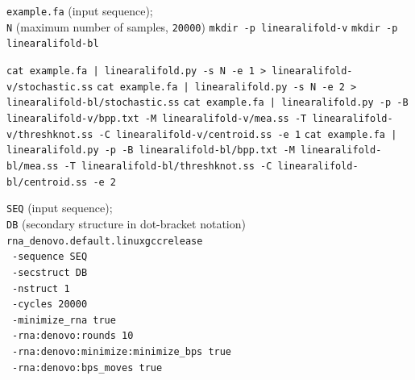 \begin{algorithm}[H]
  \caption{Sampling RNA secondary structures with \texttt{LinearAliFold}}
  \label{ch6:alg:linearalifold-sampling}
  \begin{algorithmic}[1]
    \REQUIRE \texttt{example.fa} (input sequence);\\
    \texttt{N} (maximum number of samples, \texttt{20000})
    \STATE \texttt{mkdir -p linearalifold-v}
    \STATE \texttt{mkdir -p linearalifold-bl}

    \STATE \texttt{cat example.fa | linearalifold.py -s N -e 1 > linearalifold-v/stochastic.ss}
    \STATE \texttt{cat example.fa | linearalifold.py -s N -e 2 > linearalifold-bl/stochastic.ss}
    \STATE \texttt{cat example.fa | linearalifold.py -p -B linearalifold-v/bpp.txt -M linearalifold-v/mea.ss -T linearalifold-v/threshknot.ss -C linearalifold-v/centroid.ss -e 1}
    \STATE \texttt{cat example.fa | linearalifold.py -p -B linearalifold-bl/bpp.txt -M linearalifold-bl/mea.ss -T linearalifold-bl/threshknot.ss -C linearalifold-bl/centroid.ss -e 2}
  \end{algorithmic}
\end{algorithm}

\begin{algorithm}[H]
  \caption{Conformational sampling with FARFAR2}
  \label{ch6:alg:rna_denovo}
  \begin{algorithmic}[1]
  \REQUIRE \texttt{SEQ} (input sequence);\\
  \texttt{DB} (secondary structure in dot-bracket notation)
    \STATE \texttt{rna\_denovo.default.linuxgccrelease} \\
    \ \texttt{-sequence SEQ}  \\
    \ \texttt{-secstruct DB} \\
    \ \texttt{-nstruct 1} \\
    \ \texttt{-cycles 20000} \\
    \ \texttt{-minimize\_rna true} \\
    \ \texttt{-rna:denovo:rounds 10} \\
    \ \texttt{-rna:denovo:minimize:minimize\_bps true} \\
    \ \texttt{-rna:denovo:bps\_moves true}
  \end{algorithmic}
\end{algorithm}

